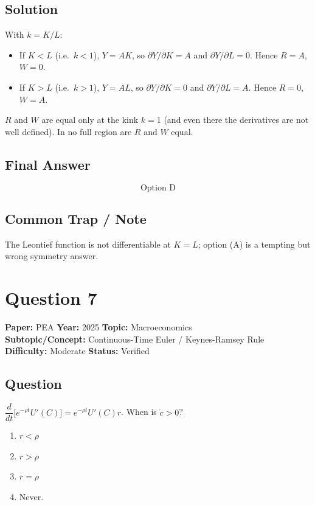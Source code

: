 \documentclass[11pt]{article}
\begin{document}
\subsection*{Solution}
With $k = K/L$:
\begin{itemize}[leftmargin=*]
\item If $K < L$ (i.e.\ $k<1$), $Y = AK$, so $\partial Y/\partial K = A$ and $\partial Y/\partial L = 0$. Hence $R = A$, $W = 0$.
\item If $K > L$ (i.e.\ $k>1$), $Y = AL$, so $\partial Y/\partial K = 0$ and $\partial Y/\partial L = A$. Hence $R = 0$, $W = A$.
\end{itemize}
$R$ and $W$ are equal only at the kink $k=1$ (and even there the derivatives are not well defined). In no full region are $R$ and $W$ equal.

\subsection*{Final Answer}
\[
\boxed{\text{Option D}}
\]

\subsection*{Common Trap / Note}
The Leontief function is not differentiable at $K=L$; option (A) is a tempting but wrong symmetry answer.

\section*{Question 7}
\textbf{Paper:} PEA \quad \textbf{Year:} 2025 \quad \textbf{Topic:} Macroeconomics \\
\textbf{Subtopic/Concept:} Continuous-Time Euler / Keynes-Ramsey Rule \\
\textbf{Difficulty:} Moderate \quad \textbf{Status:} Verified

\subsection*{Question}
$\dfrac{d}{dt}\bigl[e^{-\rho t}U'(C)\bigr] = e^{-\rho t}U'(C) r$. When is $\dot c > 0$?
\begin{enumerate}[label=(\Alph*)]
\item $r < \rho$ \quad \item $r > \rho$ \quad \item $r = \rho$ \quad \item Never.
\end{enumerate}
\end{document}
